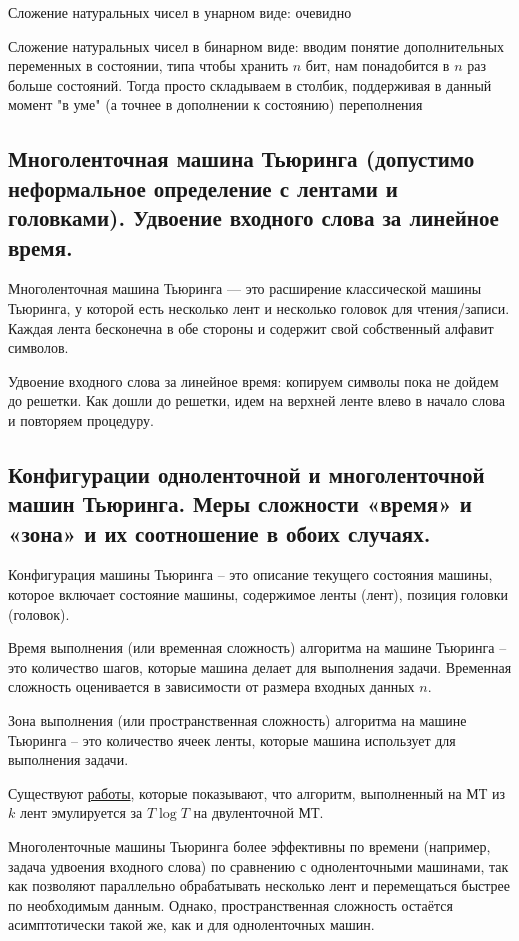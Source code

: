 \documentclass[a4paper, 10pt]{article}
\begin{document}
Сложение натуральных чисел в унарном виде: очевидно

Сложение натуральных чисел в бинарном виде: вводим понятие дополнительных переменных в состоянии, типа чтобы хранить $n$ бит, нам понадобится в $n$ раз больше состояний. Тогда просто складываем в столбик, поддерживая в данный момент "в уме" (а точнее в дополнении к состоянию) переполнения

\subsection{Многоленточная машина Тьюринга (допустимо неформальное определение с лентами и головками). Удвоение входного слова за линейное время.}

Многоленточная машина Тьюринга — это расширение классической машины Тьюринга, у которой есть несколько лент и несколько головок для чтения/записи. Каждая лента бесконечна в обе стороны и содержит свой собственный алфавит символов.

Удвоение входного слова за линейное время: копируем символы пока не дойдем до решетки. Как дошли до решетки, идем на верхней ленте влево в начало слова и повторяем процедуру.

\subsection{Конфигурации одноленточной и многоленточной машин Тьюринга. Меры сложности «время» и «зона» и их соотношение в обоих случаях.}

Конфигурация машины Тьюринга -- это описание текущего состояния машины, которое включает состояние машины, содержимое ленты (лент), позиция головки (головок).

Время выполнения (или временная сложность) алгоритма на машине Тьюринга -- это количество шагов, которые машина делает для выполнения задачи. Временная сложность оценивается в зависимости от размера входных данных $n$.

Зона выполнения (или пространственная сложность) алгоритма на машине Тьюринга -- это количество ячеек ленты, которые машина использует для выполнения задачи.

\hfill

Существуют \href{https://www.cs.bu.edu/faculty/gacs/courses/cs535/papers/HennieStearns66.pdf}{работы}, которые показывают, что алгоритм, выполненный на МТ из $k$ лент эмулируется за $T\log T$ на двуленточной МТ.

Многоленточные машины Тьюринга более эффективны по времени (например, задача удвоения входного слова) по сравнению с одноленточными машинами, так как позволяют параллельно обрабатывать несколько лент и перемещаться быстрее по необходимым данным. Однако, пространственная сложность остаётся асимптотически такой же, как и для одноленточных машин.
\end{document}
